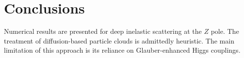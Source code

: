 \section{Conclusions}\label{sec:conclusions}

Numerical results are presented for deep inelastic scattering at the $Z$
pole. The treatment of diffusion-based particle clouds is admittedly
heuristic. The main limitation of this approach is its reliance on
Glauber-enhanced Higgs couplings.

